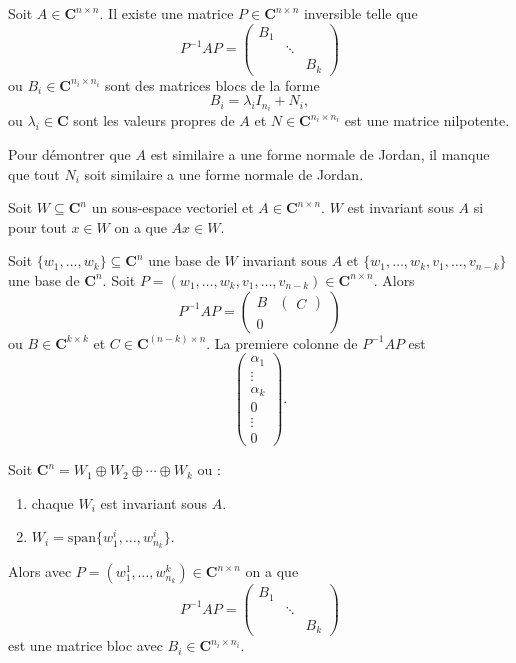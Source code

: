 
\begin{theorem}
Soit $A\in \mathbf{C}^{n\times n}$. Il existe une matrice $P\in \mathbf{C}^{n\times n}$ inversible telle que
$$
P^{-1}AP=\begin{pmatrix}
B_{1} \\
 & \ddots \\
 &  & B_{k}
\end{pmatrix}
$$
ou $B_{i}\in \mathbf{C}^{n_{i}\times n_{i}}$ sont des matrices blocs de la forme
$$
B_{i}=\lambda _{i}I_{n_{i}}+N_{i},
$$
ou $\lambda _{i}\in \mathbf{C}$ sont les valeurs propres de $A$ et $N\in \mathbf{C}^{n_{i}\times n_{i}}$ est une matrice nilpotente.
\end{theorem}

Pour démontrer que $A$ est similaire a une forme normale de Jordan, il manque que tout $N_{i}$ soit similaire a une forme normale de Jordan.
\begin{definition}
Soit $W\subseteq \mathbf{C}^{n}$ un sous-espace vectoriel et $A\in \mathbf{C}^{n\times n}$. $W$ est invariant sous $A$ si pour tout $x \in W$ on a que $Ax \in W$.
\end{definition}
\begin{remark}
Soit $\{ w_{1},\dots,w_{k} \}\subseteq \mathbf{C}^{n}$ une base de $W$ invariant sous $A$ et $\{ w_{1},\dots,w_{k},v_{1},\dots,v_{n-k} \}$ une base de $\mathbf{C}^{n}$.  Soit $P=(w_{1},\dots,w_{k},v_{1},\dots,v_{n-k})\in \mathbf{C}^{n\times n}$. Alors
$$
P^{-1}AP=\begin{pmatrix}
B & \begin{pmatrix}
C
\end{pmatrix}
 \\0
\end{pmatrix}
$$
ou $B\in \mathbf{C}^{k\times k}$ et $C\in \mathbf{C}^{(n-k)\times n}$. La premiere colonne de $P^{-1}AP$ est 
$$
\begin{pmatrix}
\alpha_{1} \\
\vdots \\
\alpha _{k} \\
0 \\
\vdots \\
0
\end{pmatrix}.
$$
\end{remark}
\begin{remark}
Soit $\mathbf{C}^{n}=W_{1}\oplus W_{2}\oplus \cdots\oplus W_{k}$ ou :
\begin{enumerate}
\item chaque $W_{i}$ est invariant sous $A$.
\item $W_{i}=\mathrm{span}\{ w_{1}^{i},\dots,w_{n_{k}}^{i} \}$.
\end{enumerate}
Alors avec $P=(w_{1}^{1},\dots,w_{n_{k}}^{k})\in \mathbf{C}^{n\times n}$ on a que
$$
P^{-1}AP=\begin{pmatrix}
B_{1} \\
 & \ddots \\
 &  & B_{k}
\end{pmatrix}
$$
est une matrice bloc avec $B_{i}\in \mathbf{C}^{n_{i}\times n_{i}}$.
\end{remark}

